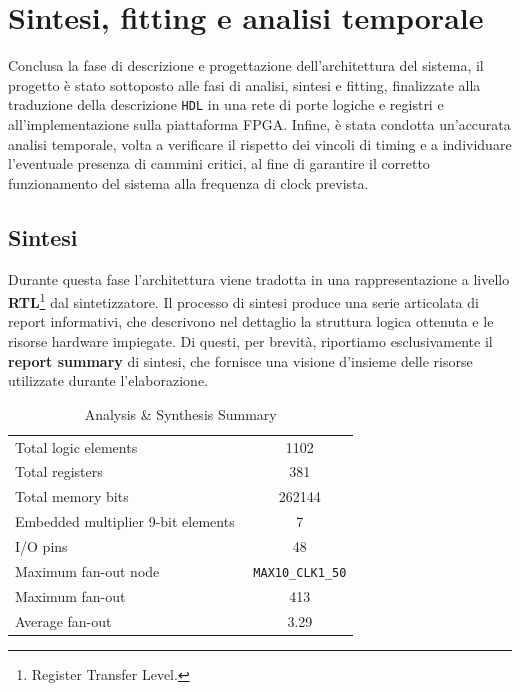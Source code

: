 \documentclass[reprint,amsmath,amssymb,aps,rmp,twoside]{revtex4-2}
\begin{document}
\section{Sintesi, fitting e analisi temporale}

Conclusa la fase di descrizione e progettazione dell’architettura del sistema, il progetto è stato sottoposto alle fasi di analisi, sintesi e fitting, finalizzate alla traduzione della descrizione \texttt{HDL} in una rete di porte logiche e registri e all'implementazione sulla piattaforma FPGA. Infine, è stata condotta un’accurata analisi temporale, volta a verificare il rispetto dei vincoli di timing e a individuare l’eventuale presenza di cammini critici, al fine di garantire il corretto funzionamento del sistema alla frequenza di clock prevista.

\subsection{Sintesi}

Durante questa fase l'architettura viene tradotta in una rappresentazione a livello \textbf{RTL}\footnote{Register Transfer Level.} dal sintetizzatore. Il processo di sintesi produce una serie articolata di report informativi, che descrivono nel dettaglio la struttura logica ottenuta e le risorse hardware impiegate. Di questi, per brevità, riportiamo esclusivamente il \textbf{report summary} di sintesi, che fornisce una visione d'insieme delle risorse utilizzate durante l'elaborazione.

\begin{table}[H]
\begin{ruledtabular}
    \begin{tabular}{l|c}
         Total logic elements&1102\\
         Total registers&381\\
         Total memory bits&262144\\
         Embedded multiplier 9-bit elements\,\,&7\\
         I/O pins&48\\
         Maximum fan-out node&\small \texttt{MAX10\_CLK1\_50}\\
         Maximum fan-out&413\\
         Average fan-out&3.29\\
    \end{tabular}
    \caption{Analysis \& Synthesis Summary}
    \label{tab:sintesi}
\end{ruledtabular}
\end{table}
\end{document}

